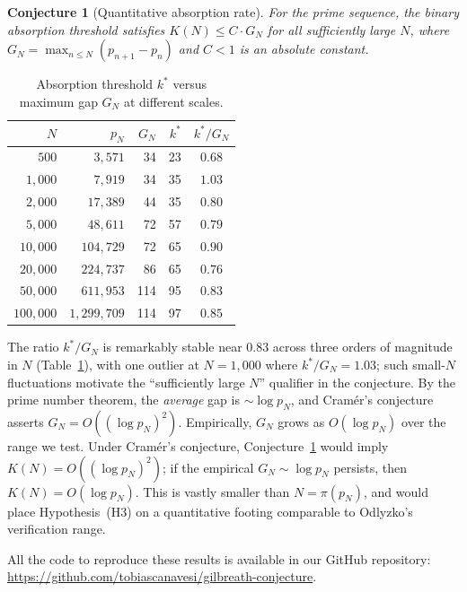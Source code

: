 \documentclass[11pt, a4paper]{amsart}
\theoremstyle{plain}
\newtheorem{conjecture}[theorem]{Conjecture}
\theoremstyle{definition}
\begin{document}
\begin{conjecture}[Quantitative absorption rate]\label{conj:absorption-rate}
For the prime sequence, the binary absorption threshold satisfies $K(N) \le C \cdot G_N$ for all sufficiently large $N$,
where $G_N = \max_{n \le N}(p_{n+1} - p_n)$ and $C < 1$ is an absolute constant.
\end{conjecture}

\begin{table}[ht]
\centering
\caption{Absorption threshold $k^*$ versus maximum gap $G_N$ at different scales.}\label{tab:absorption-rate}
\begin{tabular}{@{}rrrrc@{}}
\toprule
$N$ & $p_N$ & $G_N$ & $k^*$ & $k^*/G_N$ \\
\midrule
$500$ & $3{,}571$ & 34 & 23 & $0.68$ \\
$1{,}000$ & $7{,}919$ & 34 & 35 & $1.03$ \\
$2{,}000$ & $17{,}389$ & 44 & 35 & $0.80$ \\
$5{,}000$ & $48{,}611$ & 72 & 57 & $0.79$ \\
$10{,}000$ & $104{,}729$ & 72 & 65 & $0.90$ \\
$20{,}000$ & $224{,}737$ & 86 & 65 & $0.76$ \\
$50{,}000$ & $611{,}953$ & 114 & 95 & $0.83$ \\
$100{,}000$ & $1{,}299{,}709$ & 114 & 97 & $0.85$ \\
\bottomrule
\end{tabular}
\end{table}

\noindent
The ratio $k^*/G_N$ is remarkably stable near $0.83$ across three orders of magnitude in $N$
(Table~\ref{tab:absorption-rate}), with one outlier at $N = 1{,}000$ where $k^*/G_N = 1.03$;
such small-$N$ fluctuations motivate the ``sufficiently large $N$'' qualifier in the conjecture. By the prime number theorem, the \emph{average} gap is $\sim \log p_N$, and Cram\'er's
conjecture~\cite{Cramer1936} asserts $G_N = O((\log p_N)^2)$. Empirically, $G_N$ grows as $O(\log p_N)$
over the range we test. Under Cram\'er's conjecture, Conjecture~\ref{conj:absorption-rate} would imply
$K(N) = O((\log p_N)^2)$; if the empirical $G_N \sim \log p_N$ persists, then $K(N) = O(\log p_N)$.
This is vastly smaller than $N = \pi(p_N)$, and would place Hypothesis~(H3)
on a quantitative footing comparable to Odlyzko's verification range.

\medskip

All the code to reproduce these results is available in our GitHub repository: \url{https://github.com/tobiascanavesi/gilbreath-conjecture}.
\end{document}

